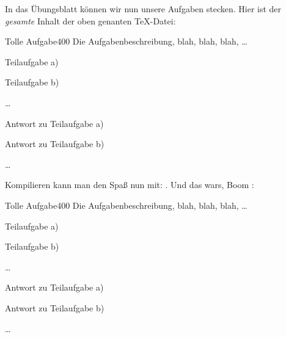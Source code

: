 In das Übungsblatt können wir nun unsere Aufgaben stecken. Hier ist der \emph{gesamte} Inhalt der oben genanten \TeX-Datei:
\begin{latex}
\begin{aufgabe}{Tolle Aufgabe}{400} %
    Die Aufgabenbeschreibung, blah, blah, blah, \ldots
    \begin{aufgaben}
        \item Teilaufgabe a)
        \item Teilaufgabe b)
        \item \ldots
    \end{aufgaben}
\vSplitter
    \begin{aufgaben}
        \item Antwort zu Teilaufgabe a)
        \item Antwort zu Teilaufgabe b)
        \item \ldots
    \end{aufgaben}
\end{aufgabe}

\end{latex}

Kompilieren kann man den Spaß nun mit: . Und das wars, Boom \Smiley:\\

\begin{aufgabe}{Tolle Aufgabe}{400} %
    Die Aufgabenbeschreibung, blah, blah, blah, \ldots
    \begin{aufgaben}
        \item Teilaufgabe a)
        \item Teilaufgabe b)
        \item \ldots
    \end{aufgaben}
\vSplitter
    \begin{aufgaben}
        \item Antwort zu Teilaufgabe a)
        \item Antwort zu Teilaufgabe b)
        \item \ldots
    \end{aufgaben}
\end{aufgabe}

\clearpage
